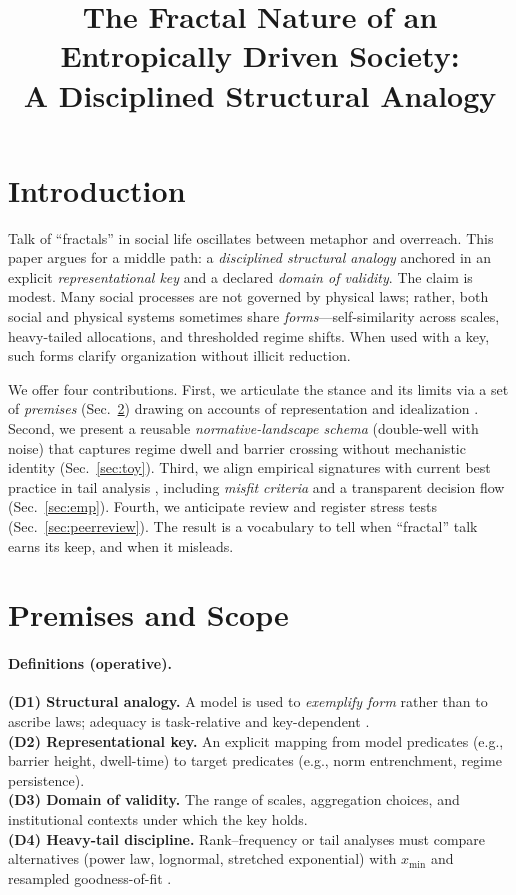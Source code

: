 \documentclass[sn-basic,referee,pdflatex]{sn-jnl}
\title{The Fractal Nature of an Entropically Driven Society:\\A Disciplined Structural Analogy}
\author*[1]{\fnm{Demetrios} \sur{Agourakis}}\email{demetrios@agourakis.med.br}
\affil[1]{\orgname{Faculdade S\~ao Leopoldo Mandic}, \orgaddress{\city{Campinas}, \country{Brazil}}}
\begin{document}
\maketitle
\linenumbers

\section{Introduction}\label{sec:intro}
Talk of “fractals” in social life oscillates between metaphor and overreach. This paper argues for a middle path: a \emph{disciplined structural analogy} anchored in an explicit \emph{representational key} and a declared \emph{domain of validity}. The claim is modest. Many social processes are not governed by physical laws; rather, both social and physical systems sometimes share \emph{forms}---self-similarity across scales, heavy-tailed allocations, and thresholded regime shifts. When used with a key, such forms clarify organization without illicit reduction.

We offer four contributions. First, we articulate the stance and its limits via a set of \emph{premises} (Sec.~\ref{sec:premises}) drawing on accounts of representation and idealization \citep{Suarez2004,FriggNguyen2016,Contessa2007,Potochnik2017}. Second, we present a reusable \emph{normative-landscape schema} (double-well with noise) that captures regime dwell and barrier crossing without mechanistic identity (Sec.~\ref{sec:toy}). Third, we align empirical signatures with current best practice in tail analysis \citep{Newman2005,ClausetShaliziNewman2009}, including \emph{misfit criteria} and a transparent decision flow (Sec.~\ref{sec:emp}). Fourth, we anticipate review and register stress tests (Sec.~\ref{sec:peerreview}). The result is a vocabulary to tell when “fractal” talk earns its keep, and when it misleads.

\section{Premises and Scope}\label{sec:premises}

\paragraph{Definitions (operative).}
\textbf{(D1) Structural analogy.} A model is used to \emph{exemplify form} rather than to ascribe laws; adequacy is task-relative and key-dependent \citep{Suarez2004,FriggNguyen2016,Contessa2007}.\\
\textbf{(D2) Representational key.} An explicit mapping from model predicates (e.g., barrier height, dwell-time) to target predicates (e.g., norm entrenchment, regime persistence).\\
\textbf{(D3) Domain of validity.} The range of scales, aggregation choices, and institutional contexts under which the key holds.\\
\textbf{(D4) Heavy-tail discipline.} Rank--frequency or tail analyses must compare alternatives (power law, lognormal, stretched exponential) with \(x_{\min}\) and resampled goodness-of-fit \citep{Newman2005,ClausetShaliziNewman2009}.
\end{document}
